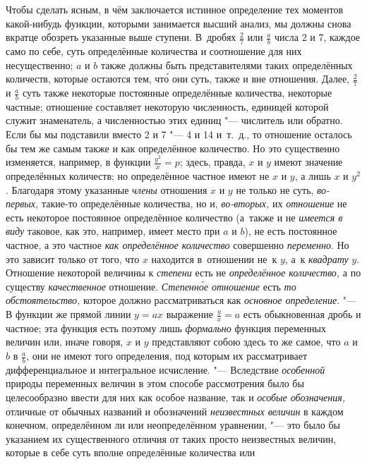 Чтобы сделать ясным, в чём заключается истинное определение тех моментов
какой-нибудь функции, которыми занимается высший анализ, мы должны снова
вкратце обозреть указанные выше ступени. В~дробях $\frac 2 7$ или $\frac a b$
числа 2 и 7, каждое само по себе, суть определённые количества и соотношение
для них несущественно; $a$ и $b$ также должны быть представителями таких
определённых количеств, которые остаются тем, чт\'{о} они суть, также и вне
отношения. Далее, $\frac 2 7$ и $\frac a b$ суть также некоторые постоянные
определённые количества, некоторые частные; отношение составляет некоторую
численность, единицей которой служит знаменатель, а численностью этих единиц
"--- числитель или обратно. Если бы мы подставили вместо 2 и 7 "--- 4 и 14
и~т.~д., то отношение осталось бы тем же самым также и как определённое
количество. Но это существенно изменяется, например, в функции
$\frac{y^2}x=p$; здесь, правда, $x$ и $y$ имеют значение определённых
количеств; но определённое частное имеют не $x$ и $y$, а лишь $x$ и $y^2$.
Благодаря этому указанные {\em члены} отношения $x$ и $y$ не только не суть,
{\em во-первых,} такие-то определённые количества, но и, {\em во-вторых,} их
{\em отношение} не есть некоторое постоянное определённое количество (а~также и
не {\em имеется в виду} таковое, как это, например, имеет место при $a$ и $b$),
не есть постоянное частное, а это частное {\em как определённое количество}
совершенно {\em переменно}. Но это зависит только от того, что $x$ находится
в~отношении не~к $y$, а~к {\em квадрату} $y$. Отношение некоторой величины
к {\em степени} есть не {\em определённое количество,} а по существу
{\em качественное} отношение. {\em Степенн\'{о}е отношение} есть {\em то
обстоятельство,} которое должно рассматриваться как {\em основное определение}.
"--- В функции же прямой линии $y=ax$ выражение $\frac y x=a$ есть обыкновенная
дробь и частное; эта функция есть поэтому лишь {\em формально} функция
переменных величин или, иначе говоря, $x$ и $y$ представляют собою здесь то же
самое, что $a$ и $b$ в $\frac a b$, они не имеют того определения, под которым
их рассматривает дифференциальное и интегральное исчисление. "--- Вследствие
{\em особенной} природы переменных величин в этом способе рассмотрения было бы
целесообразно ввести для них как особое название, так и
{\em особые обозначения,} отличные от обычных названий и обозначений
{\em неизвестных величин} в каждом конечном, определённом ли или неопределённом
уравнении, "--- это было бы указанием их существенного отличия от таких просто
неизвестных величин, которые в себе суть вполне определённые количества или
